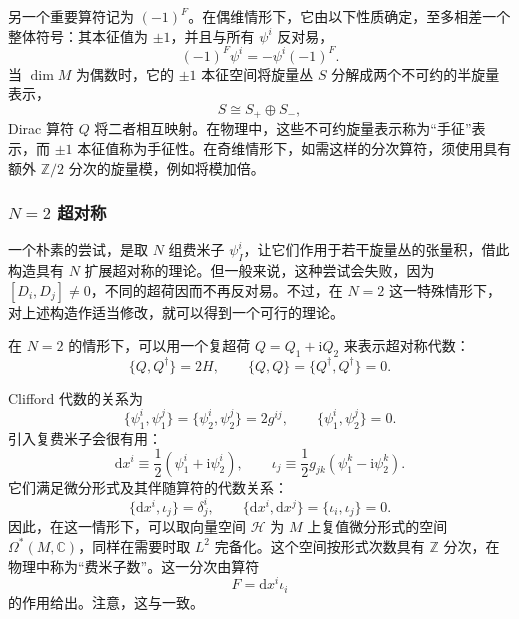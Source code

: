 另一个重要算符记为 $(-1)^F$。在偶维情形下，它由以下性质确定，至多相差一个整体符号：其本征值为 $\pm1$，并且与所有 $\psi^i$ 反对易，
\begin{equation}\label{eq:3.6}
(-1)^F\psi^i=-\psi^i(-1)^F.
\end{equation}
当 $\dim M$ 为偶数时，它的 $\pm1$ 本征空间将旋量丛 $S$ 分解成两个不可约的半旋量表示，
\begin{equation}\label{eq:3.7}
S\cong S_+\oplus S_-,
\end{equation}
Dirac 算符 $Q$ 将二者相互映射。在物理中，这些不可约旋量表示称为“手征”表示，而 $\pm1$ 本征值称为手征性。在奇维情形下，如需这样的分次算符，须使用具有额外 $\mathbb{Z}/2$ 分次的旋量模，例如将模加倍。

\subsubsection{\texorpdfstring{$N=2$}{N=2} 超对称}\label{sec:3.1.1.1}

一个朴素的尝试，是取 $N$ 组费米子 $\psi_I^i$，让它们作用于若干旋量丛的张量积，借此构造具有 $N$ 扩展超对称的理论。但一般来说，这种尝试会失败，因为 $[D_i,D_j]\ne0$，不同的超荷因而不再反对易。不过，在 $N=2$ 这一特殊情形下，对上述构造作适当修改，就可以得到一个可行的理论。

在 $N=2$ 的情形下，可以用一个复超荷 $Q=Q_1+\mathrm{i}Q_2$ 来表示超对称代数：
\begin{equation}\label{eq:3.8}
\{Q,Q^\dagger\}=2H,\qquad
\{Q,Q\}=\{Q^\dagger,Q^\dagger\}=0.
\end{equation}

Clifford 代数的关系为
\[
\{\psi_1^i,\psi_1^j\}=\{\psi_2^i,\psi_2^j\}=2g^{ij},
\qquad\{\psi_1^i,\psi_2^j\}=0.
\]
引入复费米子会很有用：
\[
\mathrm{d}x^i\equiv\frac12(\psi_1^i+\mathrm{i}\psi_2^i),
\qquad
\iota_j\equiv\frac12g_{jk}(\psi_1^k-\mathrm{i}\psi_2^k).
\]
它们满足微分形式及其伴随算符的代数关系：
\begin{equation}\label{eq:3.9}
\{\mathrm{d}x^i,\iota_j\}=\delta^i_j,
\qquad\{\mathrm{d}x^i,\mathrm{d}x^j\}=\{\iota_i,\iota_j\}=0.
\end{equation}
因此，在这一情形下，可以取向量空间 $\mathcal{H}$ 为 $M$ 上复值微分形式的空间 $\Omega^*(M,\mathbb{C})$，同样在需要时取 $L^2$ 完备化。这个空间按形式次数具有 $\mathbb{Z}$ 分次，在物理中称为“费米子数”。这一分次由算符
\begin{equation}\label{eq:3.10}
F=\mathrm{d}x^i\iota_i
\end{equation}
的作用给出。注意，这与一致。

